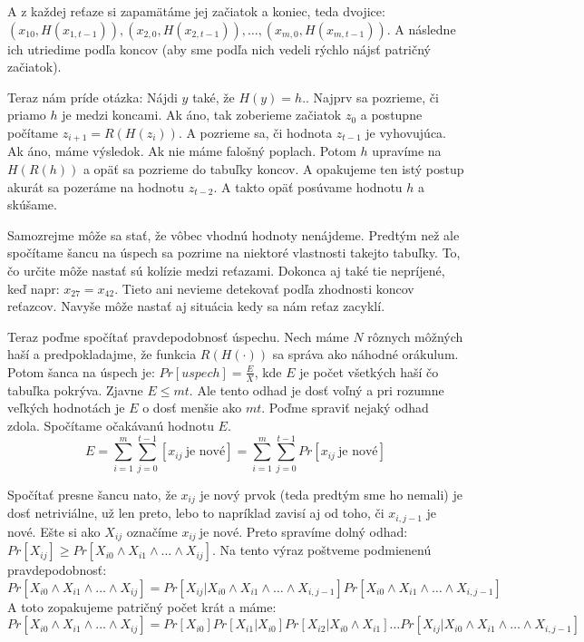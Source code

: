 A z každej reťaze si zapamätáme jej začiatok a koniec, teda dvojice:\\ 
$(x_{10}, H(x_{1,t-1})), (x_{2,0}, H(x_{2,t-1})), \dots, (x_{m,0}, H(x_{m,t-1}))$.
A následne ich utriedime podľa koncov (aby sme podľa nich vedeli rýchlo nájsť patričný začiatok).

Teraz nám príde otázka: \clqq Nájdi $y$ také, že $H(y)=h$.\crqq. Najprv sa pozrieme, či priamo $h$ je medzi koncami.
Ak áno, tak zoberieme začiatok $z_0$ a postupne počítame $z_{i+1} = R(H(z_i))$. A pozrieme sa, či hodnota $z_{t-1}$ je vyhovujúca.
Ak áno, máme výsledok. Ak nie máme falošný poplach.
Potom $h$ upravíme na $H(R(h))$ a opäť sa pozrieme do tabuľky koncov. A opakujeme ten istý postup akurát sa pozeráme na hodnotu $z_{t-2}$.
A takto opäť posúvame hodnotu $h$ a skúšame.

Samozrejme môže sa stať, že vôbec vhodnú hodnoty nenájdeme. Predtým než ale spočítame šancu na úspech sa pozrime
na niektoré vlastnosti takejto tabuľky. To, čo určite môže nastať sú kolízie medzi reťazami. Dokonca aj také tie nepríjené, keď napr:
$x_{27} = x_{42}$. Tieto ani nevieme detekovať podľa zhodnosti koncov reťazcov. Navyše môže nastať aj situácia kedy sa nám reťaz
zacyklí. 

Teraz poďme spočítať pravdepodobnosť úspechu. Nech máme $N$ rôznych môžných haší a predpokladajme, že
funkcia $R(H(\cdot))$ sa správa ako náhodné orákulum. Potom šanca na úspech je:
$Pr[uspech] = \frac{E}{X}$, kde $E$ je počet všetkých haší čo tabuľka pokrýva. Zjavne $E \leq mt$.
Ale tento odhad je dosť voľný a pri rozumne veľkých hodnotách je $E$ o dosť menšie ako $mt$. 
Poďme spraviť nejaký odhad zdola. Spočítame očakávanú hodnotu $E$.
$$E = \displaystyle\sum_{i=1}^m \displaystyle\sum_{j=0}^{t-1} [x_{ij} ~\text{je nové}] = 
\displaystyle\sum_{i=1}^m \displaystyle\sum_{j=0}^{t-1} Pr[x_{ij} ~\text{je nové}] $$

Spočítať presne šancu nato, že $x_{ij}$ je nový prvok (teda predtým sme ho nemali) je dosť netriviálne,
už len preto, lebo to napríklad zavisí aj od toho, či $x_{i,j-1}$ je nové. Ešte si ako $X_{ij}$ označíme $x_{ij} ~\text{je nové}$.
Preto spravíme dolný odhad:
$Pr[X_{ij}] \geq Pr[X_{i0}\land X_{i1} \land \dots \land X_{ij}]$.
Na tento výraz poštveme podmienenú pravdepodobnosť:
$$Pr[X_{i0} \land X_{i1} \land \dots \land X_{ij}] = 
Pr[X_{ij} | X_{i0} \land X_{i1} \land \dots \land X_{i,j-1} ]
Pr[X_{i0} \land X_{i1} \land \dots \land X_{i,j-1} ]$$
A toto zopakujeme patričný počet krát a máme:
$$Pr[X_{i0} \land X_{i1} \land \dots \land X_{ij}] = Pr[X_{i0}] Pr[X_{i1} | X_{i0}] Pr[X_{i2} | X_{i0} \land X_{i1}] \dots
Pr[X_{ij} | X_{i0} \land X_{i1} \land \dots \land X_{i,j-1}]$$

